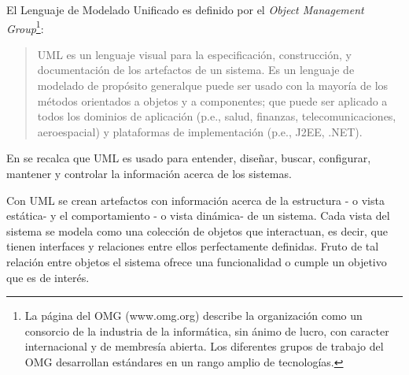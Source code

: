 El Lenguaje de Modelado Unificado es definido por el \textit{Object Management Group}\footnote{La página del OMG (www.omg.org) describe la organización como un consorcio de la industria de la informática, sin ánimo de lucro, con caracter internacional y de membresía abierta. Los diferentes grupos de trabajo del OMG desarrollan estándares en un rango amplio de tecnologías.}:
\begin{quote}
UML es un lenguaje visual para la especificación, construcción, y documentación de los artefactos de un sistema. Es un lenguaje de modelado de propósito generalque puede ser usado con la mayoría de los métodos orientados a objetos y a componentes; que puede ser aplicado a todos los dominios de aplicación (p.e., salud, finanzas, telecomunicaciones, aeroespacial) y plataformas de implementación (p.e., J2EE, .NET). \end{quote} 

En \cite{jacobson2005} se recalca que UML es usado para entender, diseñar, buscar, configurar, mantener y controlar la información acerca de los sistemas.

Con UML se crean artefactos con información acerca de la estructura - o vista estática- y el comportamiento - o vista dinámica- de un sistema. Cada vista del sistema se modela como una colección de objetos que interactuan, es decir, que tienen interfaces y relaciones entre ellos perfectamente definidas. Fruto de tal relación entre objetos el sistema ofrece una funcionalidad o cumple un objetivo que es de interés.